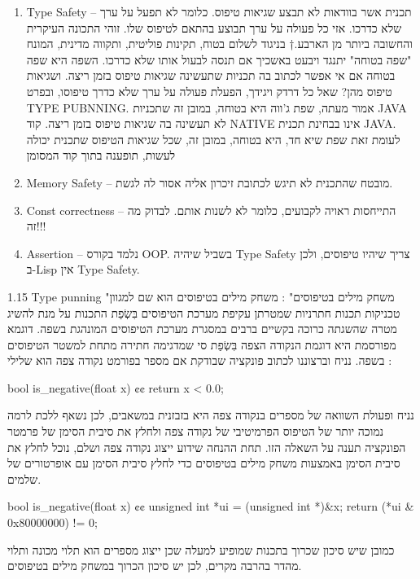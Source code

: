       \begin{enumerate}
          \item  Type Safety – תכנית אשר בוודאות לא תבצע שגיאות טיפוס. כלומר לא תפעל על
      ערך שלא כדרכו. אזי כל פעולה על ערך תבוצע בהתאם לטיפוס שלו. זוהי התכונה
      העיקרית והחשובה ביותר מן הארבע.†{ בניגוד לשלום בטוח, תקינות פוליטית,
      ותקווה מדינית, המונח "שפה בטוחה" יתנגד ויבעט באשכיך אם תנסה לבעול אותו
    שלא כדרכו. השפה היא שפה בטוחה אם אי אפשר לכתוב בה תכניות שתעשינה שגיאות
  טיפוס בזמן ריצה. ושגיאות טיפוס מהן? שאל כל דרדק ויגידך, הפעלת פעולה על ערך
שלא כדרך טיפוסו, ובפרט TYPE PUBNNING. אמור מעתה, שפת ג'ווה היא בטוחה, במובן זה
שתכניות JAVA לא תעשינה בה שגיאות טיפוס בזמן ריצה. קוד NATIVE אינו בבחינת תכנית
JAVA. לעומת זאת שפת שיא חד, היא בטוחה, במובן זה, שכל שגיאות הטיפוס שתכנית יכולה
לעשות, תופענה בתוך קוד המסומן} 
\item Memory Safety – מובטח שהתכנית לא תיגש לכתובת
זיכרון אליה אסור לה לגשת.
      \item Const correctness – התייחסות ראויה לקבועים, כלומר לא לשנות אותם. לבדוק מה זה!!!

      \item Assertion – נלמד בקורס OOP.
      בשביל שיהיה Type Safety צריך שיהיו טיפוסים, ולכן ב-Lisp אין Type Safety.
  \end{enumerate}

      1.15 Type punning "משחק מילים בטיפוסים" :
      משחק מילים בטיפוסים הוא שם למגוון טכניקות תכנות חתרניות שמטרתן עקיפת מערכת הטיפוסים בִּשְׂפַת התכנות על מנת להשיג מטרה שהשגתה כרוכה בקשיים ברבים במסגרת מערכת הטיפוסים המונהגת בשפה.
      דוגמא מפורסמת היא דוגמת הנקודה הצפה בִּשְׂפַת סי שמדגימה חתירה מתחת למשטר הטיפוסים בשפה.
      נניח וברצוננו לכתוב פונקציה שבודקת אם מספר בפורמט נקודה צפה הוא שלילי :
\begin{CPP}
bool is_negative(float x) {¢¢
   return x < 0.0;
}
\end{CPP}
      נניח ופעולת השוואה של מספרים בנקודה צפה היא בזבזנית במשאבים, לכן נשאף ללכת לרמה נמוכה יותר של הטיפוס הפרמיטיבי של נקודה צפה ולחלץ את סיבית הסימן של פרמטר הפונקציה תענה על השאלה הזו. תחת ההנחה שידוע ייצוג נקודה צפה ושלם, נוכל לחלץ את סיבית הסימן באמצעות משחק מילים בטיפוסים כדי לחלץ סיבית הסימן עם אופרטורים של שלמים.
\begin{CPP}
bool is_negative(float x) {¢¢
  unsigned int *ui = (unsigned int *)&x;
  return (*ui & 0x80000000) != 0;
}
\end{CPP}
      כמובן שיש סיכון שכרוך בתכנות שמופיע למעלה שכן ייצוג מספרים הוא תלוי מכונה ותלוי מהדר בהרבה מקרים, לכן יש סיכון הכרוך במשחק מילים בטיפוסים.

